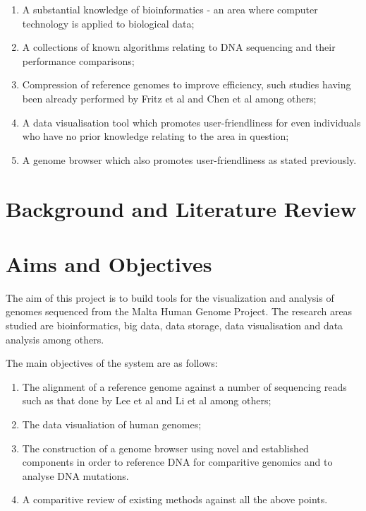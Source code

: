 \documentclass{csfyp}
\begin{document}
\begin{enumerate}

  \item A substantial knowledge of bioinformatics - an area where computer technology is applied to biological data;

  \item A collections of known algorithms relating to DNA sequencing and their performance comparisons;

  \item Compression of reference genomes to improve efficiency, such studies having been already performed by Fritz et al \cite{refcompression} and Chen et al \cite{compression} among others;

  \item A data visualisation tool which promotes user-friendliness for even individuals who have no prior knowledge relating to the area in question;

  \item A genome browser which also promotes user-friendliness as stated previously.

\end{enumerate}


\section{Background and Literature Review}




\section{Aims and Objectives}

The aim of this project is to build tools for the visualization and analysis of genomes sequenced from the Malta Human Genome Project.  The research areas studied are bioinformatics, big data, data storage, data visualisation and data analysis among others.

The main objectives of the system are as follows:

\begin{enumerate}

  \item The alignment of a reference genome against a number of sequencing reads such as that done by Lee et al \cite{cgreads} and Li et al \cite{bwtransform} among others;

  \item The data visualiation of human genomes;

  \item The construction of a genome browser using novel and established components in order to reference DNA for comparitive genomics and to analyse DNA mutations.  

  \item A comparitive review of existing methods against all the above points.

\end{enumerate}
\end{document}
